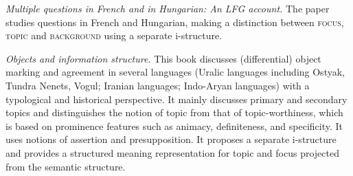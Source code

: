 \documentclass[output=paper,hidelinks]{langscibook}
\begin{document}
\vspace{+6pt}
\citet{Gazdik2010} \textit{Multiple questions in French and in Hungarian: An LFG account.} The paper studies questions in French and Hungarian, making a distinction between \textsc{focus}, \textsc{topic} and \textsc{background} using a separate i-structure.

\vspace{+6pt}
\citet{DN} \textit{Objects and information structure.} This book discusses (differential) object marking and agreement in several languages (Uralic languages including Ostyak, Tundra Nenets, Vogul; Iranian languages; Indo-Ary\-an languages) with a typological and historical perspective. It mainly discusses primary and secondary topics and distinguishes the notion of topic from that of topic-worthiness, which is based on prominence features such as animacy, definiteness, and specificity. It uses  notions of assertion and presupposition. It proposes a separate i-structure and provides a structured meaning representation for topic and focus projected from the semantic structure.

\end{document}
